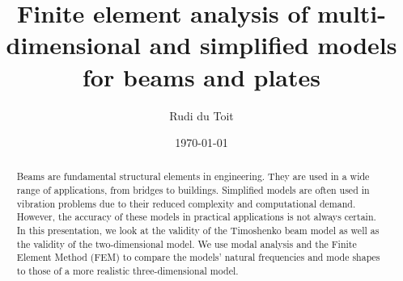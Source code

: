 \documentclass{article}
\title{Finite element analysis of multi-dimensional and simplified models for beams and plates}
\author{Rudi du Toit}
\date{\today}
\begin{document}
\maketitle

\begin{abstract}
    Beams are fundamental structural elements in engineering. They are used in a wide range of applications, from bridges to buildings. Simplified models are often used in vibration problems due to their reduced complexity and computational demand. However, the accuracy of these models in practical applications is not always certain. In this presentation, we look at the validity of the Timoshenko beam model as well as the validity of the two-dimensional model. We use modal analysis and the Finite Element Method (FEM) to compare the models' natural frequencies and mode shapes to those of a more realistic three-dimensional model.
\end{abstract}
\end{document}

